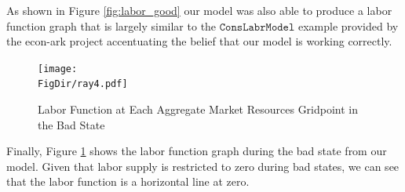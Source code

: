 \documentclass[titlepage,letterpaper]{\econtex}
\begin{document}
As shown in Figure \ref{fig:labor_good} our model was also able to produce a labor function graph that is largely similar to the $\texttt{ConsLabrModel}$ example provided by the econ-ark project accentuating the belief that our model is working correctly. 

  \begin{figure}[H]
        \centering
      \texttt{[image: \\FigDir/ray4.pdf]}
      \caption{Labor Function at Each Aggregate Market Resources Gridpoint in the Bad State}
    \label{fig:labor_bad}
  \end{figure}

Finally, Figure \ref{fig:labor_bad} shows the labor function graph during the bad state from our model. Given that labor supply is restricted to zero during bad states, we can see that the labor function is a horizontal line at zero.


\clearpage\pagebreak\vfill\eject


\end{document}
